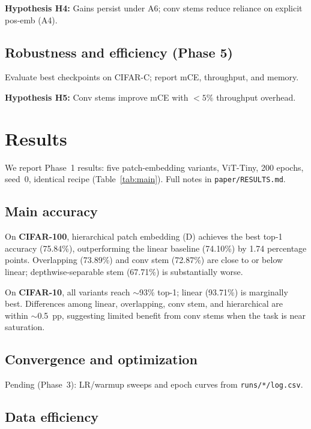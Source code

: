 \documentclass[10pt,twocolumn]{article}
\begin{document}
\textbf{Hypothesis H4:} Gains persist under A6; conv stems reduce reliance on explicit pos-emb (A4).

\subsection{Robustness and efficiency (Phase 5)}

Evaluate best checkpoints on CIFAR-C; report mCE, throughput, and memory.

\textbf{Hypothesis H5:} Conv stems improve mCE with $<5\%$ throughput overhead.

\section{Results}
\label{sec:results}

We report Phase~1 results: five patch-embedding variants, ViT-Tiny, 200 epochs, seed~0, identical recipe (Table~\ref{tab:main}). Full notes in \texttt{paper/RESULTS.md}.

\subsection{Main accuracy}

On \textbf{CIFAR-100}, hierarchical patch embedding (D) achieves the best top-1 accuracy (75.84\%), outperforming the linear baseline (74.10\%) by 1.74 percentage points. Overlapping (73.89\%) and conv stem (72.87\%) are close to or below linear; depthwise-separable stem (67.71\%) is substantially worse.

On \textbf{CIFAR-10}, all variants reach $\sim$93\% top-1; linear (93.71\%) is marginally best. Differences among linear, overlapping, conv stem, and hierarchical are within $\sim$0.5~pp, suggesting limited benefit from conv stems when the task is near saturation.

\subsection{Convergence and optimization}

Pending (Phase~3): LR/warmup sweeps and epoch curves from \texttt{runs/*/log.csv}.

\subsection{Data efficiency}
\end{document}
